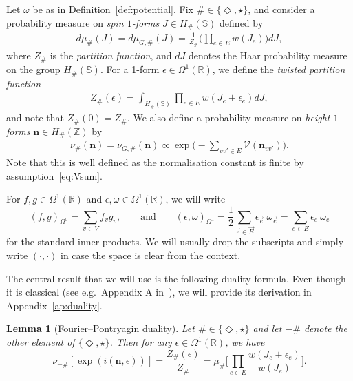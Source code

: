 \documentclass[11pt, reqno]{amsart}
\newtheorem{lemma}[theorem]{Lemma}
\numberwithin{equation}{section}
\theoremstyle{definition}
\theoremstyle{remark}
\newcommand{\ZZ}{\mathbb{Z}}
\newcommand{\RR}{\mathbb{R}}
\newcommand{\J}{J}
\newcommand{\n}{\mathbf{n}}
\newcommand{\exact}{\star}
\newcommand{\coclosed}{\Diamond}
\begin{document}
Let $\omega$ be as in Definition~\ref{def:potential}. Fix $\# \in \{\coclosed, \exact\}$, and consider a probability measure on \emph{spin $1$-forms} $J\in H_{\#}(\mathbb{S})$ defined by
\begin{align} \label{def:xy}
	d\mu_{\#}(\J)=d \mu_{G, \#}(\J) =\frac{1}{Z_{\#}} \Big(\prod_{e \in E}w(\J_e) \Big) d \J,
\end{align}
where $Z_{\#}$ is the \emph{partition function}, and $d \J$ denotes the Haar probability measure on the group $H_{\#}(\mathbb{S})$. 
For a 1-form $\epsilon \in \Omega^1(\RR)$, we define the \emph{twisted partition function}
\begin{align*}
	Z_{\#}(\epsilon) = \int_{H_{\#}(\mathbb{S})} \prod_{e\in  E} w  (\J_{e}+\epsilon_e ) d \J, 
\end{align*}
and note that $Z_{\#}(0)=Z_{\#}$.
We also define a probability measure on \emph{height $1$-forms} $\n \in H_{\#}(\ZZ)$ by
\begin{align} \label{eq:defh}
	\nu_{\#}(\n) =\nu_{G, \#} (\n) \propto \exp\Big(-\sum_{vv'\in E}\mathcal V(\n_{vv'})\Big).
\end{align}
Note that this is well defined as the normalisation constant is finite by assumption~\eqref{eq:Vsum}. 


For $f,g\in  \Omega^1(\mathbb R)$ and $\epsilon, \omega\in \Omega^1(\mathbb R)$, we will write 
\[
(f,g)_{\Omega^0}= \sum_{v\in V} f_vg_v, \qquad \text{and} \qquad (\epsilon, \omega)_{\Omega^1} = \frac{1}{2}\sum_{\vec{e} \in \vec{E}} \epsilon_{\vec{e}} \:\omega_{\vec{e}} =\sum_{{e} \in {E}} \epsilon_{{e}} \:\omega_{{e}} 
\]
for the standard inner products. We will usually drop the subscripts and simply write $(\cdot,\cdot)$ in case the space is clear from the context.

The central result that we will use is the following duality formula. Even though it is classical (see e.g.\ Appendix A in~\cite{FroSpe}), we will provide its derivation in Appendix~\ref{ap:duality}.
\begin{lemma}[Fourier--Pontryagin duality] \label{lem:duality}
	Let $\# \in \{\coclosed, \exact\}$ and let $-\#$ denote the other element of $ \{\coclosed, \exact\}$. 
	Then for any $\epsilon \in \Omega^1(\RR)$, we have
	\[
	\nu_{-\#} [\exp({ i (\n, \epsilon)}) ] = \frac{Z_{\#}(\epsilon)}{Z_{\#}}=\mu_{\#}\Big[\prod_{e\in E} \frac{w  (\J_e+\epsilon_e )}{w  (\J_{e})}\Big].
	\]
\end{lemma}
\end{document}
